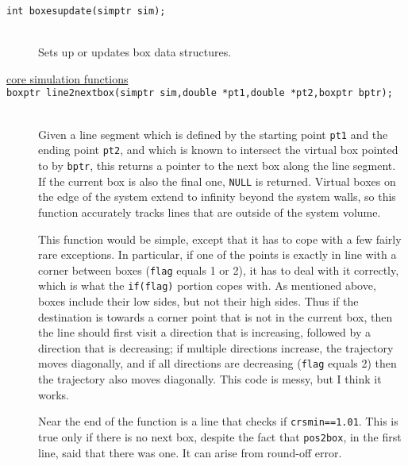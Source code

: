 \documentclass {book}
\begin{document}
\begin{description}
\item[\texttt{int boxesupdate(simptr sim);}]
\hfill \\
Sets up or updates box data structures.

\item[\underline{core simulation functions}]

\item[\texttt{boxptr line2nextbox(simptr sim,double *pt1,double *pt2,boxptr bptr);}]
\hfill \\
Given a line segment which is defined by the starting point \texttt{pt1} and the ending point \texttt{pt2}, and which is known to intersect the virtual box pointed to by \texttt{bptr}, this returns a pointer to the next box along the line segment. If the current box is also the final one, \texttt{NULL} is returned. Virtual boxes on the edge of the system extend to infinity beyond the system walls, so this function accurately tracks lines that are outside of the system volume.

This function would be simple, except that it has to cope with a few fairly rare exceptions. In particular, if one of the points is exactly in line with a corner between boxes (\texttt{flag} equals 1 or 2), it has to deal with it correctly, which is what the \texttt{if(flag)} portion copes with. As mentioned above, boxes include their low sides, but not their high sides. Thus if the destination is towards a corner point that is not in the current box, then the line should first visit a direction that is increasing, followed by a direction that is decreasing; if multiple directions increase, the trajectory moves diagonally, and if all directions are decreasing (\texttt{flag} equals 2) then the trajectory also moves diagonally. This code is messy, but I think it works.

Near the end of the function is a line that checks if \texttt{crsmin==1.01}. This is true only if there is no next box, despite the fact that \texttt{pos2box}, in the first line, said that there was one. It can arise from round-off error.


\end{description}
\end{document}
